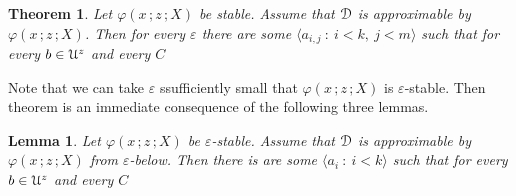 \documentclass{amsproc}
\makeatletter
\newcounter{thm}
\theoremstyle{mio}
\newtheorem{theorem}[thm]{Theorem}\tcolorboxenvironment{theorem}{mythm}
\newtheorem{lemma}[thm]{Lemma}\tcolorboxenvironment{lemma}{mythm}
\providecommand{\proofNameStyle}{\bfseries}
\renewenvironment{proof}[1][\proofname]{\par
  \pushQED{\qed}%
  \normalfont%
  \trivlist
  \item[\hskip\labelsep
        \proofNameStyle
    #1\@addpunct{.}]\ignorespaces
}{%
  \popQED\endtrivlist\@endpefalse
}
\makeatother
\begin{document}
\begin{theorem}\label{thm_epsilon_stability_definability}
  Let $\varphi(x\,;z\,;X)$ be stable.
  Assume that ${\EuScript D}$ is approximable by $\varphi(x\,;z\,;X)$.
  Then for every $\varepsilon$ there are some $\langle a_{i,j}\ :\ i< k,\ j<m\rangle$ such that for every $b\in{\EuScript U}^z$ and every $C$\medskip

  \medskip

\end{theorem}

\begin{proof}
  Note that we can take $\varepsilon$ ssufficiently small that $\varphi(x\,;z\,;X)$ is $\varepsilon$-stable. 
  Then theorem is an immediate consequence of the following three lemmas.
\end{proof}

\begin{lemma}
  Let $\varphi(x\,;z\,;X)$ be $\varepsilon$-stable.
  Assume that ${\EuScript D}$ is approximable by $\varphi(x\,;z\,;X)$ from $\varepsilon$-below.
  Then there is are some $\langle a_i\ :\ i<k\rangle$ such that for every $b\in{\EuScript U}^z$ and every $C$\medskip

  \medskip 

\end{lemma}
\end{document}
